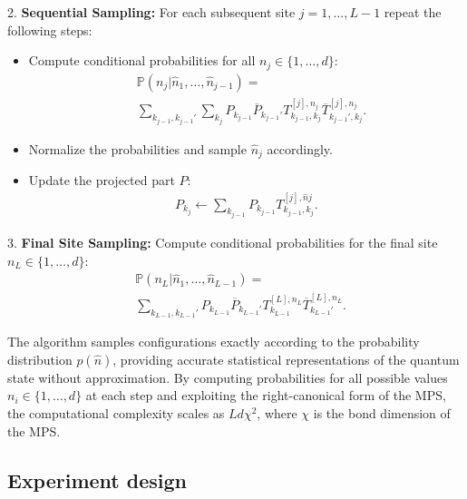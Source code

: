 2. \textbf{Sequential Sampling:} For each subsequent site $j=1,\ldots,L-1$ repeat the following steps:
\begin{itemize}
    \item Compute conditional probabilities for all $n_j\in\{1,\ldots,d\}$:
    \begin{equation}
    \begin{split}
        &\mathbb{P}(n_j | \hat{n}_1, \dots, \hat{n}_{j-1}) =\\& \sum_{k_{j-1}, k_{j-1}'} \sum_{k_j} P_{k_{j-1}}\overline{P}_{k_{j-1}'} T^{[j], n_j}_{k_{j-1}, k_j}\overline{T}^{[j], n_j}_{k_{j-1}', k_j}.
    \end{split}
    \end{equation}
    \item Normalize the probabilities and sample $\hat n_j$ accordingly.
    \item Update the projected part $P$: \begin{align}
        P_{k_j} \leftarrow \sum_{k_{j-1}} P_{k_{j-1}} T^{[j], \hat{n}j}_{k_{j-1}, k_j}.
    \end{align}
\end{itemize}

3. \textbf{Final Site Sampling:} Compute conditional probabilities for the final site $n_L\in\{1,\ldots,d\}$:
\begin{align}
    &\mathbb{P}(n_L | \hat{n}_1, \dots, \hat{n}_{L-1}) =\\& \sum_{k_{L-1}, k_{L-1}'} P_{k_{L-1}}\overline{P}_{k_{L-1}'} T^{[L], n_L}_{k_{L-1}}\overline{T}^{[L], n_L}_{k_{L-1}'}.
\end{align}

The algorithm samples configurations exactly according to the probability distribution $p(\hat n)$, providing accurate statistical representations of the quantum state without approximation. By computing probabilities for all possible values $n_i\in\{1,\ldots,d\}$ at each step and exploiting the right-canonical form of the MPS, the computational complexity scales as $Ld\chi^2$, where $\chi$ is the bond dimension of the MPS.


\subsection{Experiment design}\label{sec:experiment_design} 

